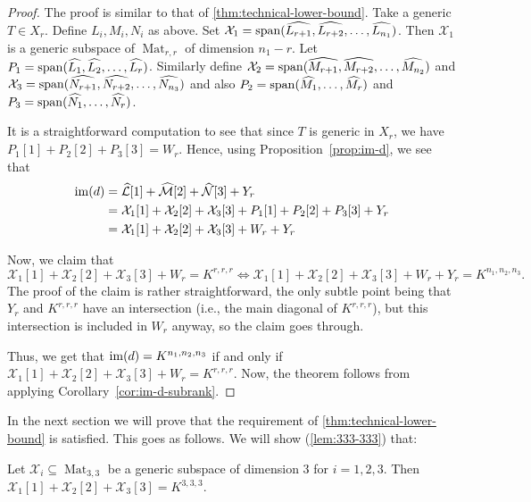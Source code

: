 \documentclass[10pt,a4paper]{article}
\theoremstyle{definition}
\theoremstyle{remark}
\newcommand{\spa}{{\rm span}}
\newcommand{\Mat}{\operatorname{Mat}}
\newcommand{\im}{{\rm im}}
\begin{document}
%

%

\begin{proof}
The proof is similar to that of \autoref{thm:technical-lower-bound}.
Take a generic $T \in X_r$. Define $L_i, M_i, N_i$ as above. Set $\mathcal{X}_1 = \spa (\widehat{L_{r+1}}, \widehat{L_{r+2}}, \dots, \widehat{L_{n_1}})$. Then $\mathcal{X}_1$ is a generic subspace of $\Mat_{r,r}$ of dimension $n_1 - r$. Let $P_1 = \spa (\widehat{L_1}, \widehat{L_2},\dots,\widehat{L_r})$. Similarly define $\mathcal{X}_2 = \spa (\widehat{M_{r+1}}, \widehat{M_{r+2}}, \dots, \widehat{M_{n_2}})$ and $\mathcal{X}_3 = \spa (\widehat{N_{r+1}}, \widehat{N_{r+2}}, \dots, \widehat{N_{n_3}})$ and also $P_2 = \spa (\widehat{M_1},\dots,\widehat{M_r})$ and $P_3 = \spa (\widehat{N_1}, \dots, \widehat{N_r})$.

It is a straightforward computation to see that since $T$ is generic in $X_r$, we have $P_1[1] + P_2[2] + P_3[3] = W_r$.
Hence, using Proposition~\ref{prop:im-d}, we see that 
\begin{align*}
\im(d) &= \mathcal{\widehat{L}}[1] + \mathcal{\widehat{M}}[2] + \mathcal{\widehat{N}}[3] + Y_r \\
&= \mathcal{X}_1[1] + \mathcal{X}_2[2] + \mathcal{X}_3[3] + P_1[1] + P_2[2] + P_3[3] +  Y_r  \\
& = \mathcal{X}_1[1] + \mathcal{X}_2[2] + \mathcal{X}_3[3] + W_r + Y_r
\end{align*}

Now, we claim that 
$$
\mathcal{X}_1[1] + \mathcal{X}_2[2] + \mathcal{X}_3[3] + W_r = K^{r,r,r} \Leftrightarrow \mathcal{X}_1[1] + \mathcal{X}_2[2] + \mathcal{X}_3[3] + W_r + Y_r = K^{n_1,n_2,n_3}.
$$
The proof of the claim is rather straightforward, the only subtle point being that $Y_r$ and $K^{r,r,r}$ have an intersection (i.e., the main diagonal of $K^{r,r,r}$), but this intersection is included in $W_r$ anyway, so the claim goes through.

Thus, we get that $\im(d) = K^{n_1,n_2,n_3}$ if and only if $\mathcal{X}_1[1] + \mathcal{X}_2[2] + \mathcal{X}_3[3] + W_r = K^{r,r,r}$. Now, the theorem follows from applying Corollary~\ref{cor:im-d-subrank}.
\end{proof}

%


In the next section we will prove that the requirement of \autoref{thm:technical-lower-bound} is satisfied. This goes as follows. We will show (\autoref{lem:333-333}) that:

\begin{lemma}\label{lem:333}
Let $\mathcal{X}_i \subseteq \Mat_{3,3}$ be a generic subspace of dimension 3 for $i=1,2,3$. Then $\mathcal{X}_1[1]+\mathcal{X}_2[2]+\mathcal{X}_3[3] = K^{3,3,3}$.
\end{lemma}
\end{document}
